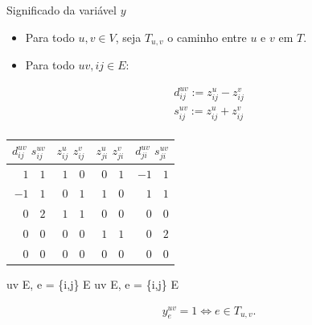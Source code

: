 \documentclass[dvipsnames]{beamer}
\begin{document}
\begin{frame}{Significado da variável $y$ \hyperlink{form_1}{\beamergotobutton{$\leftarrow$}}}
  \hypertarget{sig_y}{}
  {\footnotesize
  \begin{itemize}
    \item Para todo $u,v \in V$, seja $T_{u,v}$ o caminho entre $u$ e $v$ em $T$.
    \item Para todo $uv,ij \in E$:
  \end{itemize}
\begin{align*}
  d^{u v}_{ij} := z^{u}_{ij} - z^{v}_{ij}\\
  s^{u v}_{ij} := z^{u}_{ij} + z^{v}_{ij}\\
  \end{align*}

\begin{center}
  \noindent
  \label{tab:sum_diff} 
\begin{tabular}{|r|r|r|r|}\hline
{$d^{uv}_{ij}$ $s^{uv}_{ij}$} & {$z^{u}_{ij}$ $z^{v}_{ij}$} & {$z^{u}_{ji}$ $z^{v}_{ji}$} & {$d^{uv}_{ji}$ $s^{uv}_{ji}$}
\\ \hline\hline 
$1\quad 1$ & $1\quad 0$ & $0\quad 1$ & $-1\quad 1$ \\
$-1\quad 1$ & $0\quad 1$ & $1\quad 0$ & $1\quad 1$ \\
$0\quad 2$ & $1\quad 1$ & $0\quad 0$ & $0\quad 0$ \\
$0\quad 0$ & $0\quad 0$ & $1\quad 1$ & $0\quad 2$ \\
$0\quad 0$ & $0\quad 0$ & $0\quad 0$ & $0\quad 0$ \\
\hline\hline
\end{tabular}
\end{center}


\begin{lpformulation}[]
   {uv \in E, \forall e = \{i,j\} \in E}
   {uv \in E, \forall e = \{i,j\} \in E}
\end{lpformulation}

\begin{align}
  \label{afirm:valor_y}
  y^{uv}_e = 1 \Leftrightarrow e \in T_{u,v}.
\end{align}
}

\end{frame}
\end{document}

